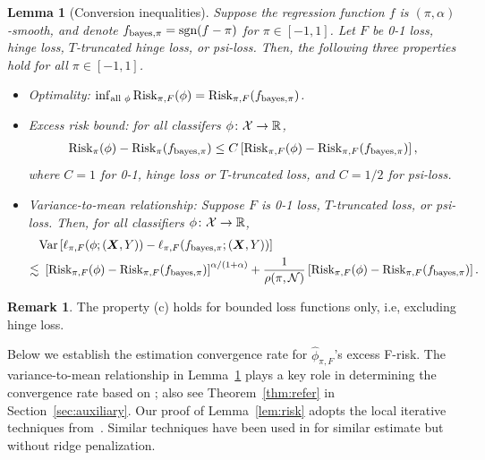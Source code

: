 \documentclass[11pt]{article}
\theoremstyle{plain}
\newtheorem{lem}{Lemma}
\theoremstyle{definition}
\newtheorem{rmk}{Remark}
\def\sign{\textup{sgn}}
\def\bayespif{f_{\textup{bayes},\pi}}
\def\risk{\textup{Risk}_\pi}
\def\riskF{\textup{Risk}_{\pi,F}}
\begin{document}
\begin{lem}[Conversion inequalities]\label{lem:prepare} Suppose the regression function $f$ is $(\pi,\alpha)$-smooth, and denote $\bayespif=\sign(f-\pi)$ for $\pi\in[-1,1]$. Let $F$ be 0-1 loss, hinge loss, $T$-truncated hinge loss, or psi-loss. Then, the following three properties hold for all $\pi\in[-1,1]$.
\begin{itemize}[label={2.\arabic*},wide, labelwidth=!, labelindent=0pt]
\item[(a)] Optimality: $\inf_{\text{all }\phi}\riskF(\phi)=\riskF(\bayespif)$.
\item[(b)] Excess risk bound: for all classifers $\phi\colon \mathcal{X}\to\mathbb{R}$,
\begin{align}\label{eq:b1}
\risk(\phi)-\risk(\bayespif) \leq  C\left[\riskF(\phi)-\riskF(\bayespif)\right],
\end{align}
where $C=1$ for 0-1, hinge loss or $T$-truncated loss, and $C=1/2$ for psi-loss. 
\item[(c)] Variance-to-mean relationship: Suppose $F$ is 0-1 loss, $T$-truncated loss, or psi-loss. Then, for all classifiers $\phi\colon \mathcal{X}\to\mathbb{R}$, 
\begin{align}\label{eq:b2}
&\textup{Var}\left[\ell_{\pi,F}(\phi; (\mX,Y))-\ell_{\pi,F}(\bayespif; (\mX,Y))\right]  \notag \\
\lesssim &\ 
\left[\riskF(\phi)-\riskF(\bayespif)\right]^{\alpha/(1+\alpha)}+ {1\over \rho(\pi, \tN)}\left[\riskF(\phi)-\riskF(\bayespif)\right].
 \end{align}
 \end{itemize}
\end{lem}
\begin{rmk}
The property (c) holds for bounded loss functions only, i.e, excluding hinge loss. 
\end{rmk}

Below we establish the estimation convergence rate for $\hat \phi_{\pi,F}$'s excess F-risk. The variance-to-mean relationship in Lemma~\ref{lem:prepare} plays a key role in determining the convergence rate based on \citet[Theorem 3]{shen1994convergence}; also see Theorem~\ref{thm:refer} in Section~\ref{sec:auxiliary}. Our proof of Lemma~\ref{lem:risk} adopts the local iterative techniques from~\citet[Theorem 3]{wang2008probability}. Similar techniques have been used in \citet[Theorem 4]{bartlett2006convexity} for similar estimate but without ridge penalization.
\end{document}
